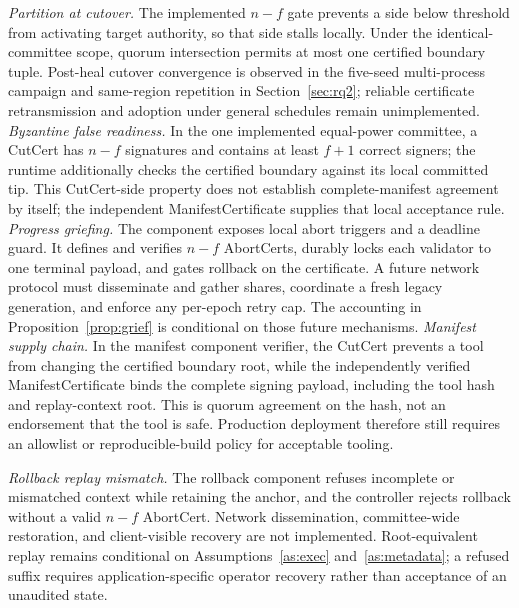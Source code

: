 \documentclass[journal]{IEEEtran}
\theoremstyle{definition}
\theoremstyle{remark}
\begin{document}
\emph{Partition at cutover.} The implemented $n-f$ gate prevents a side below threshold from
activating target authority, so that side stalls locally. Under the identical-committee scope,
quorum intersection permits at most one certified boundary tuple. Post-heal cutover convergence is
observed in the five-seed multi-process campaign and same-region repetition in
Section~\ref{sec:rq2}; reliable certificate retransmission and adoption under general schedules
remain unimplemented. \emph{Byzantine false readiness.} In the one implemented equal-power committee, a CutCert
has $n-f$ signatures and contains at least $f+1$ correct signers; the runtime additionally checks the
certified boundary against its local committed tip. This CutCert-side property does not establish
complete-manifest agreement by itself; the independent ManifestCertificate supplies that local
acceptance rule. \emph{Progress griefing.} The component exposes local abort triggers
and a deadline guard. It defines and verifies $n-f$ AbortCerts, durably locks each validator to one
terminal payload, and gates rollback on the certificate. A future network protocol must disseminate
and gather shares, coordinate a fresh legacy generation, and enforce any per-epoch retry cap. The
accounting in Proposition~\ref{prop:grief} is conditional on those future mechanisms. \emph{Manifest supply
chain.} In the manifest component verifier, the CutCert prevents a tool from changing the certified
boundary root, while the independently verified ManifestCertificate binds the complete signing
payload, including the tool hash and replay-context root. This is quorum agreement on the hash, not
an endorsement that the tool is safe. Production deployment therefore still requires an allowlist
or reproducible-build policy for acceptable tooling.

\emph{Rollback replay mismatch.} The rollback component refuses incomplete or mismatched context
while retaining the anchor, and the controller rejects rollback without a valid $n-f$ AbortCert.
Network dissemination, committee-wide restoration, and client-visible recovery are not implemented.
Root-equivalent replay remains conditional on Assumptions~\ref{as:exec}
and~\ref{as:metadata}; a refused suffix requires application-specific operator recovery rather than
acceptance of an unaudited state.
\end{document}
